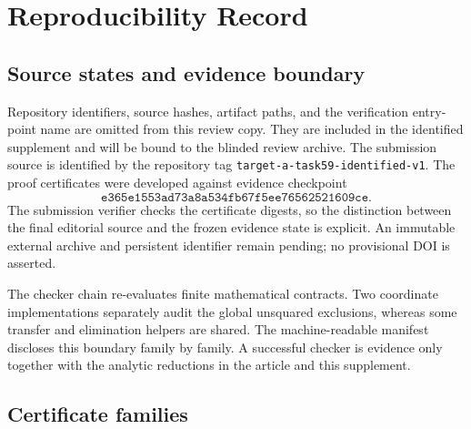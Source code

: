 \section{Reproducibility Record}
\label{sec:reproducibility}

\subsection{Source states and evidence boundary}

\ifdefined\TargetAAnonymous
Repository identifiers, source hashes, artifact paths, and the verification
entry-point name are omitted from this review copy. They are included in the
identified supplement and will be bound to the blinded review archive.
\else
The submission source is identified by the repository tag
\texttt{target-a-task59-identified-v1}. The proof certificates were developed
against evidence checkpoint
\[
\texttt{e365e1553ad73a8a534fb67f5ee76562521609ce}.
\]
The submission verifier checks the certificate digests, so the distinction
between the final editorial source and the frozen evidence state is explicit.
An immutable external archive and persistent identifier remain pending; no
provisional DOI is asserted.
\fi

The checker chain re-evaluates finite mathematical contracts. Two coordinate
implementations separately audit the global unsquared exclusions, whereas
some transfer and elimination helpers are shared. The machine-readable
manifest discloses this boundary family by family. A successful checker is
evidence only together with the analytic reductions in the article and this
supplement.

\subsection{Certificate families}

